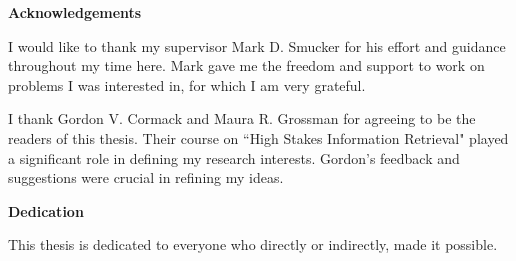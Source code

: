 \cleardoublepage


\begin{center}\textbf{Acknowledgements}\end{center}

I would like to thank my supervisor Mark D. Smucker for his effort and guidance
throughout my time here. Mark gave me the freedom and support to work on
problems I was interested in, for which I am very grateful.

I thank Gordon V. Cormack and Maura R. Grossman for agreeing to be the readers
of this thesis. Their course on ``High Stakes Information Retrieval" played a
significant role in defining my research interests. Gordon's feedback and
suggestions were crucial in refining my ideas.

\cleardoublepage


\begin{center}\textbf{Dedication}\end{center}

\centerline{This thesis is dedicated to everyone who directly or indirectly, made
it possible.}

\cleardoublepage

\renewcommand\contentsname{Table of Contents}
\tableofcontents
\cleardoublepage
{}    %

\listoftables
\cleardoublepage
{}		%

\listoffigures
\cleardoublepage
{}		%



